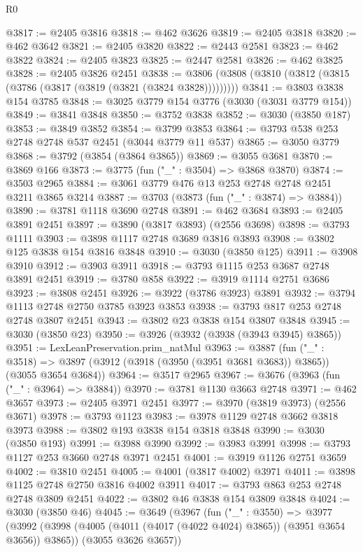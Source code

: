 \begin{lexlean}{R0}
\begin{coremodule}
@3817 := @2405 @3816
@3818 := @462 @3626
@3819 := @2405 @3818
@3820 := @462 @3642
@3821 := @2405 @3820
@3822 := @2443 @2581
@3823 := @462 @3822
@3824 := @2405 @3823
@3825 := @2447 @2581
@3826 := @462 @3825
@3828 := @2405 @3826 @2451
@3838 := @3806 (@3808 (@3810 (@3812 (@3815 (@3786 (@3817 (@3819 (@3821 (@3824 @3828)))))))))
@3841 := @3803 @3838 @154 @3785
@3848 := @3025 @3779 @154 @3776 (@3030 (@3031 @3779 @154))
@3849 := @3841 @3848
@3850 := @3752 @3838
@3852 := @3030 (@3850 @187)
@3853 := @3849 @3852
@3854 := @3799 @3853
@3864 := @3793 @538 @253 @2748 @2748 @537 @2451 (@3044 @3779 @11 @537)
@3865 := @3050 @3779
@3868 := @3792 (@3854 (@3864 @3865))
@3869 := @3055 @3681
@3870 := @3869 @166
@3873 := @3775 (fun ("_" : @3504) => @3868 @3870)
@3874 := @3503 @2965
@3884 := @3061 @3779 @476 @13 @253 @2748 @2748 @2451 @3211 @3865 @3214
@3887 := @3703 (@3873 (fun ("_" : @3874) => @3884))
@3890 := @3781 @1118 @3690 @2748
@3891 := @462 @3684
@3893 := @2405 @3891 @2451
@3897 := @3890 (@3817 @3893) (@2556 @3698)
@3898 := @3793 @1111
@3903 := @3898 @1117 @2748 @3689 @3816 @3893
@3908 := @3802 @125 @3838 @154 @3816 @3848
@3910 := @3030 (@3850 @125)
@3911 := @3908 @3910
@3912 := @3903 @3911
@3918 := @3793 @1115 @253 @3687 @2748 @3891 @2451
@3919 := @3780 @858
@3922 := @3919 @1114 @2751 @3686
@3923 := @3808 @2451
@3926 := @3922 (@3786 @3923) @3891
@3932 := @3794 @1113 @2748 @2750 @3785 @3923 @3853
@3938 := @3793 @817 @253 @2748 @2748 @3807 @2451
@3943 := @3802 @23 @3838 @154 @3807 @3848
@3945 := @3030 (@3850 @23)
@3950 := @3926 (@3932 (@3938 (@3943 @3945) @3865))
@3951 := LexLeanPreservation.prim_natMul
@3963 := @3887
    (fun ("_" : @3518) =>
    @3897 (@3912 (@3918 (@3950 (@3951 @3681 @3683)) @3865)) (@3055 @3654 @3684))
@3964 := @3517 @2965
@3967 := @3676 (@3963 (fun ("_" : @3964) => @3884))
@3970 := @3781 @1130 @3663 @2748
@3971 := @462 @3657
@3973 := @2405 @3971 @2451
@3977 := @3970 (@3819 @3973) (@2556 @3671)
@3978 := @3793 @1123
@3983 := @3978 @1129 @2748 @3662 @3818 @3973
@3988 := @3802 @193 @3838 @154 @3818 @3848
@3990 := @3030 (@3850 @193)
@3991 := @3988 @3990
@3992 := @3983 @3991
@3998 := @3793 @1127 @253 @3660 @2748 @3971 @2451
@4001 := @3919 @1126 @2751 @3659
@4002 := @3810 @2451
@4005 := @4001 (@3817 @4002) @3971
@4011 := @3898 @1125 @2748 @2750 @3816 @4002 @3911
@4017 := @3793 @863 @253 @2748 @2748 @3809 @2451
@4022 := @3802 @46 @3838 @154 @3809 @3848
@4024 := @3030 (@3850 @46)
@4045 := @3649
    (@3967
      (fun ("_" : @3550) =>
      @3977
        (@3992 (@3998 (@4005 (@4011 (@4017 (@4022 @4024) @3865)) (@3951 @3654 @3656)) @3865))
        (@3055 @3626 @3657))

\end{coremodule}
\end{lexlean}
